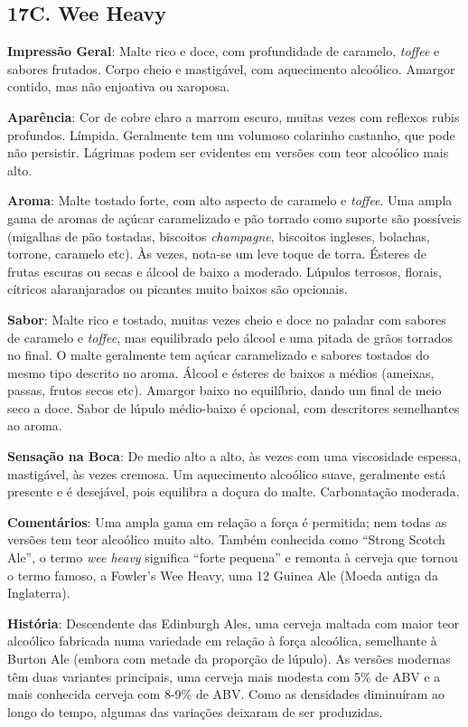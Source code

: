 \subsection*{17C. Wee Heavy}
\textbf{Impressão Geral}: Malte rico e doce, com profundidade de caramelo, \textit{toffee} e sabores frutados. Corpo cheio e mastigável, com aquecimento alcoólico. Amargor contido, mas não enjoativa ou xaroposa.

\textbf{Aparência}: Cor de cobre claro a marrom escuro, muitas vezes com reflexos rubis profundos. Límpida. Geralmente tem um volumoso colarinho castanho, que pode não persistir. Lágrimas podem ser evidentes em versões com teor alcoólico mais alto.

\textbf{Aroma}: Malte tostado forte, com alto aspecto de caramelo e \textit{toffee}. Uma ampla gama de aromas de açúcar caramelizado e pão torrado como suporte são possíveis (migalhas de pão tostadas, biscoitos \textit{champagne}, biscoitos ingleses, bolachas, torrone, caramelo etc). Às vezes, nota-se um leve toque de torra. Ésteres de frutas escuras ou secas e álcool de baixo a moderado. Lúpulos terrosos, florais, cítricos alaranjarados ou picantes muito baixos são opcionais.

\textbf{Sabor}: Malte rico e tostado, muitas vezes cheio e doce no paladar com sabores de caramelo e \textit{toffee}, mas equilibrado pelo álcool e uma pitada de grãos torrados no final. O malte geralmente tem açúcar caramelizado e sabores tostados do mesmo tipo descrito no aroma. Álcool e ésteres de baixos a médios (ameixas, passas, frutos secos etc). Amargor baixo no equilíbrio, dando um final de meio seco a doce. Sabor de lúpulo médio-baixo é opcional, com descritores semelhantes ao aroma.

\textbf{Sensação na Boca}: De medio alto a alto, às vezes com uma viscosidade espessa, mastigável, às vezes cremosa. Um aquecimento alcoólico suave, geralmente está presente e é desejável, pois equilibra a doçura do malte. Carbonatação moderada.

\textbf{Comentários}: Uma ampla gama em relação a força é permitida; nem todas as versões tem teor alcoólico muito alto. Também conhecida como “Strong Scotch Ale”, o termo \textit{wee heavy} significa “forte pequena” e remonta à cerveja que tornou o termo famoso, a Fowler’s Wee Heavy, uma 12 Guinea Ale (Moeda antiga da Inglaterra).

\textbf{História}: Descendente das Edinburgh Ales, uma cerveja maltada com maior teor alcoólico fabricada numa variedade em relação à força alcoólica, semelhante à Burton Ale (embora com metade da proporção de lúpulo). As versões modernas têm duas variantes principais, uma cerveja mais modesta com 5\% de ABV e a mais conhecida cerveja com 8-9\% de ABV. Como as densidades diminuíram ao longo do tempo, algumas das variações deixaram de ser produzidas.

